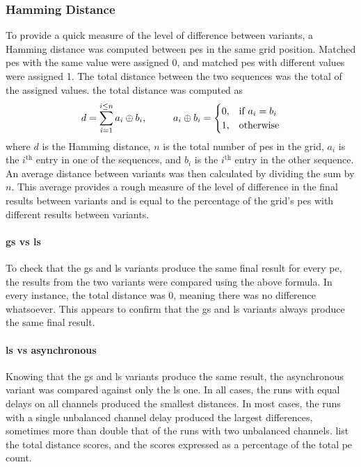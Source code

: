 \subsubsection{Hamming Distance}
To provide a quick measure of the level of difference between variants, a Hamming distance was computed between \glspl{pe} in the same grid position.  Matched \glspl{pe} with the same value were assigned 0, and matched \glspl{pe} with different values were assigned 1.  The total distance between the two sequences was the total of the assigned values.  \Ie{} the total distance was computed as \[d = \sum_{i = 1}^{i \leq n} a_i \oplus b_i\text{,}
\hspace{1.0cm}%
a_i \oplus b_i = \begin{cases}
    0, & \text{if } a_i = b_i \\
    1, & \text{otherwise}
\end{cases}
\] where \(d\) is the Hamming distance, \(n\) is the total number of \glspl{pe} in the grid, \(a_i\) is the \(i^{\text{th}}\) entry in one of the sequences, and \(b_i\) is the \(i^{\text{th}}\) entry in the other sequence.  An average distance between variants was then calculated by dividing the sum by \(n\).  This average provides a rough measure of the level of difference in the final results between variants and is equal to the percentage of the grid's \glspl{pe} with different results between variants.

\paragraph{\Gls{gs} vs \gls{ls}}
To check that the \gls{gs} and \gls{ls} variants produce the same final result for every \gls{pe}, the results from the two variants were compared using the above formula.  In every instance, the total distance was 0, meaning there was no difference whatsoever.  This appears to confirm that the \gls{gs} and \gls{ls} variants always produce the same final result.

\paragraph{\Gls{ls} vs asynchronous}
Knowing that the \gls{gs} and \gls{ls} variants produce the same result, the asynchronous variant was compared against only the \gls{ls} one.  In all cases, the runs with equal delays on all channels produced the smallest distances.  In most cases, the runs with a single unbalanced channel delay produced the largest differences, sometimes more than double that of the runs with two unbalanced channels.   list the total distance scores, and the scores expressed as a percentage of the total \gls{pe} count.

